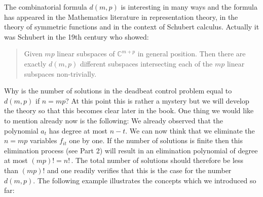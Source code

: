 \documentclass[12pt]{report}
\numberwithin{equation}{chapter}
\numberwithin{figure}{chapter}
\newcommand{\C}{\mathbb{C}}
\begin{document}
The combinatorial formula $d(m,p)$ is interesting in many ways
and the formula has appeared in the Mathematics literature in
representation theory, in the theory of symmetric functions and
in the context of Schubert calculus. Actually it was Schubert in
the 19th century who showed:
\begin{quote}
  Given $mp$ linear subspaces of $\C^{m+p}$ in general position.
  Then there are exactly $d(m,p)$ different subspaces
  intersecting each of the $mp$ linear subspaces non-trivially.
\end{quote}
Why is the number of solutions in the deadbeat control problem
equal to $d(m,p)$ if $n=mp$? At this point this is rather a
mystery but we will develop the theory so that this becomes clear
later in the book. One thing we would like to mention already now
is the following: We already observed that the polynomial $a_t$
has degree at most $n-t$.  We can now think that we eliminate the
$n=mp$ variables $f_{it}$ one by one. If the number of solutions
is finite then this elimination process (see Part 2) will result
in an elimination polynomial of degree at most $(mp)!=n!\, $. The
total number of solutions should therefore be less than $(mp)!$
and one readily verifies that this is the case for the number
$d(m,p)$.  The following example illustrates the concepts which
we introduced so far:
\end{document}
